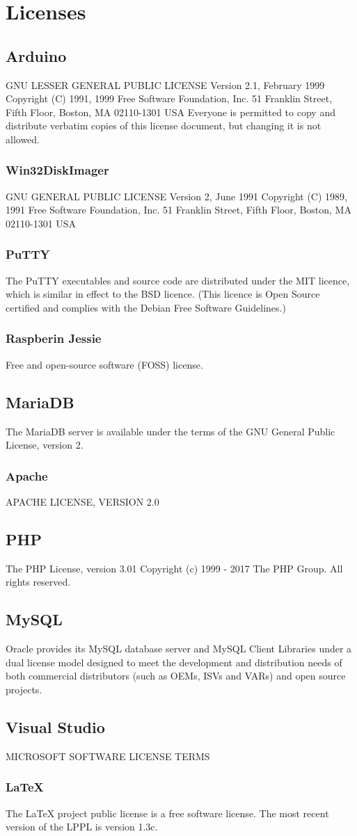 \documentclass[12pt,]{article}
\numberwithin{figure}{section}
\begin{document}
\section*{Licenses}
\subsection*{Arduino}
GNU LESSER GENERAL PUBLIC LICENSE Version 2.1, February 1999
Copyright (C) 1991, 1999 Free Software Foundation, Inc.
51 Franklin Street, Fifth Floor, Boston, MA  02110-1301  USA
Everyone is permitted to copy and distribute verbatim copies
of this license document, but changing it is not allowed.
\subsubsection*{Win32DiskImager}
GNU GENERAL PUBLIC LICENSE Version 2, June 1991 Copyright (C) 1989, 1991 Free Software Foundation, Inc. 51 Franklin Street, Fifth Floor, Boston, MA 02110-1301 USA
\subsubsection*{PuTTY}
The PuTTY executables and source code are distributed under the MIT licence, which is similar in effect to the BSD licence. (This licence is Open Source certified and complies with the Debian Free Software Guidelines.)
\subsubsection*{Raspberin Jessie}
Free and open-source software (FOSS) license.
\subsection*{MariaDB}
The MariaDB server is available under the terms of the GNU General Public License, version 2.
\subsubsection*{Apache}
APACHE LICENSE, VERSION 2.0
\subsection*{PHP}
The PHP License, version 3.01
Copyright (c) 1999 - 2017 The PHP Group. All rights reserved.
\subsection*{MySQL}
Oracle provides its MySQL database server and MySQL Client Libraries under a dual license model designed to meet the development and distribution needs of both commercial distributors (such as OEMs, ISVs and VARs) and open source projects.
\subsection*{Visual Studio}
MICROSOFT SOFTWARE LICENSE TERMS
\subsubsection*{LaTeX}
The LaTeX project public license is a free software license. The most recent version of the LPPL is version 1.3c.
\end{document}
